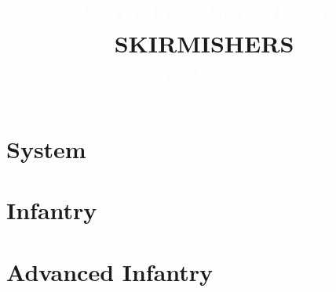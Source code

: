 \documentclass{article}
\begin{document}
\newpage

\section{System}



\newpage

\section{Infantry}



\newpage

\section{Advanced Infantry}



\newpage


\clearpage

\setlength{\headsep}{25pt}

\title{
  \selectfont
  \vspace{6px}
  \fontsize{45}{55}\selectfont\textcolor{white}{\MakeUppercase{War Department}}\\
  \fontsize{45}{55}\selectfont\MakeUppercase{Skirmishers}\\
  \fontsize{45}{55}\selectfont\textcolor{white}{\MakeUppercase{GM 1-1}}\\
}

\maketitle
\end{document}
